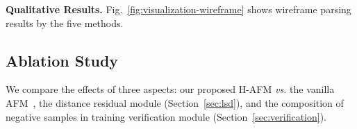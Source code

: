 \documentclass[10pt,twocolumn,letterpaper]{article}
\begin{document}
\textbf{Qualitative Results.} Fig.~\ref{fig:visualization-wireframe} shows wireframe parsing results by the five methods. 


\subsection{Ablation Study}\label{sec:ablation-sampling}
\vspace{-2mm}
We compare the effects of three aspects: our proposed H-AFM \textit{vs.} the vanilla AFM~\cite{afm}, the distance residual module (Section~\ref{sec:lsd}), and the composition of negative samples in training verification module (Section~\ref{sec:verification}).


\begin{table}[ht]
    \centering
    \vspace{-2mm}
    
\caption{The ablation study of three design and learning aspects in the proposed HAWP. See text for details.}
\vspace{-1mm}
    \label{tab:ablation-study}
\end{table}
\end{document}
